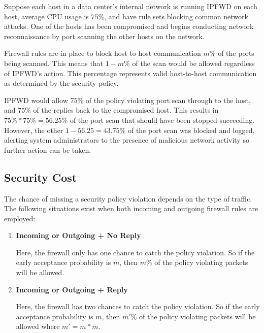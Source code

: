 \documentclass[journal]{IEEEtran}
\begin{document}
    Suppose each host in a data center's internal network is running IPFWD on
    each host, average CPU usage is $75\%$, and have rule sets blocking common
    network attacks. One of the hosts has been compromised and begins
    conducting network reconnaissance by port scanning the other hosts on the
    network. 

    Firewall rules are in place to block host to host communication $m\%$ of
    the ports being scanned. This means that $1 - m\%$ of the scan would be
    allowed regardless of IPFWD's action. This percentage represents valid
    host-to-host communication as determined by the security policy.

    IPFWD would allow $75\%$ of the policy violating port scan through to the
    host, and $75\%$ of the replies back to the compromised host. This results
    in $75\% * 75\% = 56.25\%$ of the port scan that should have been stopped
    succeeding.  However, the other $1 - 56.25 = 43.75\%$ of the port scan was
    blocked and logged, alerting system administrators to the presence of
    malicious network activity so further action can be taken.

  \subsection{Security Cost}

    The chance of missing a security policy violation depends on the type of
    traffic. The following situations exist when both incoming and outgoing
    firewall rules are employed:

    \begin{enumerate}

      \item \textbf{Incoming or Outgoing + No Reply}

        Here, the firewall only has one chance to catch the policy violation.
        So if the early acceptance probability is $m$, then $m\%$ of the policy
        violating packets will be allowed.

      \item \textbf{Incoming or Outgoing + Reply}

        Here, the firewall has two chances to catch the policy violation.  So
        if the early acceptance probability is $m$, then $m'\%$ of the policy
        violating packets will be allowed where $m' = m * m$.

    \end{enumerate}
\end{document}
